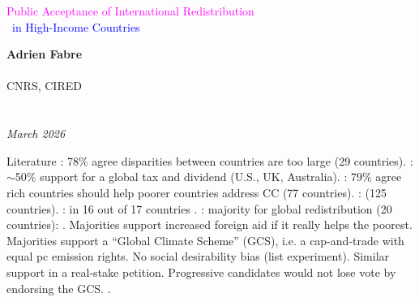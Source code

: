 \documentclass[aspectratio=169,xcolor=dvipsnames, 11pt,mathserif]{beamer}
\begin{document}

\begin{frame}
\thispagestyle{empty}
\begin{center}
\begin{LARGE}
\textcolor{magenta}{Public Acceptance of International Redistribution}\\~\textcolor{blue}{in High-Income Countries} \end{LARGE}
\vspace{1cm}

\textbf{Adrien Fabre} \\ \quad \\
CNRS, CIRED \\ \quad \\ \quad \\
\textit{March 2026} 
\end{center}
\bigskip
\end{frame}


\begin{frame}{Literature\label{literature}}
\bbvsp
\ip {}: 78\% agree disparities between countries are too large (29 countries).
\ip {}: $\sim$50\% support for a global tax and dividend (U.S., UK, Australia).
\ip {}: 79\% agree rich countries should help poorer countries address CC (77 countries).
\ip {}:  (125 countries).
\ip {}:  in 16 out of 17 countries .
\ip {}:  majority  for global redistribution (20 countries):
\bbvsp \ip {}.
\ip Majorities support increased foreign aid if it really helps the poorest.
\ip Majorities support a ``Global Climate Scheme'' (GCS), i.e. a cap-and-trade with equal pc emission rights.
\ip No social desirability bias (list experiment). Similar support in a real-stake petition.
\ip Progressive candidates would not lose vote by endorsing the GCS.
\ip {}.
\ee \ee
\end{frame}
\end{document}
